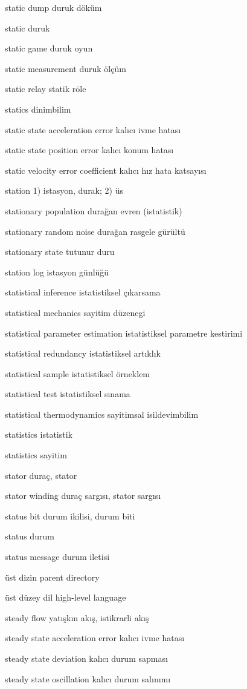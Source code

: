 \documentclass[12pt,fleqn]{article}\usepackage{../../common}
\begin{document}
static dump duruk döküm

static duruk

static game duruk oyun

static measurement duruk ölçüm

static relay statik röle

statics dinimbilim

static state acceleration error kalıcı ivme hatası

static state position error kalıcı konum hatası

static velocity error coefficient kalıcı hız hata katsayısı

station 1) istasyon, durak; 2) üs

stationary population durağan evren (istatistik)

stationary random noise durağan rasgele gürültü

stationary state tutunur duru

station log istasyon günlüğü

statistical inference istatistiksel çıkarsama

statistical mechanics sayitim düzenegi

statistical parameter estimation istatistiksel parametre kestirimi

statistical redundancy istatistiksel artıklık

statistical sample istatistiksel örneklem

statistical test istatistiksel sınama

statistical thermodynamics sayitimsal isildevimbilim

statistics istatistik

statistics sayitim

stator duraç, stator

stator winding duraç sargısı, stator sargısı

status bit durum ikilisi, durum biti

status durum

status message durum iletisi

üst dizin parent directory

üst düzey dil high-level language

steady flow yatışkın akış, istikrarli akış

steady state acceleration error kalıcı ivme hatası

steady state deviation kalıcı durum sapması

steady state oscillation kalıcı durum salınımı
\end{document}
